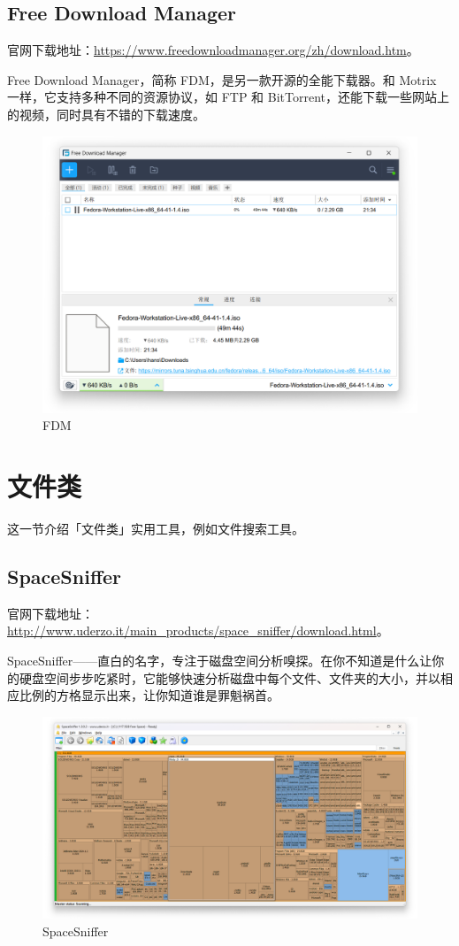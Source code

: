\subsection{Free Download Manager}

官网下载地址：\url{https://www.freedownloadmanager.org/zh/download.htm}。

Free Download Manager，简称 FDM，是另一款开源的全能下载器。和 Motrix 一样，它支持多种不同的资源协议，如 FTP 和 BitTorrent，还能下载一些网站上的视频，同时具有不错的下载速度。

\begin{figure}[htb!]
  \centering
  \includegraphics[width=.7\textwidth]{assets/software/FDM.png}
  \caption{FDM}
  \label{fig:FDM}
\end{figure}

\section{文件类}

这一节介绍「文件类」实用工具，例如文件搜索工具。

\subsection{SpaceSniffer}

官网下载地址：\url{http://www.uderzo.it/main_products/space_sniffer/download.html}。

SpaceSniffer——直白的名字，专注于磁盘空间分析嗅探。在你不知道是什么让你的硬盘空间步步吃紧时，它能够快速分析磁盘中每个文件、文件夹的大小，并以相应比例的方格显示出来，让你知道谁是罪魁祸首。

\begin{figure}[htb!]
  \centering
  \includegraphics[width=.8\textwidth]{assets/software/SpaceSniffer.png}
  \caption{SpaceSniffer}
  \label{fig:SpaceSniffer}
\end{figure}

